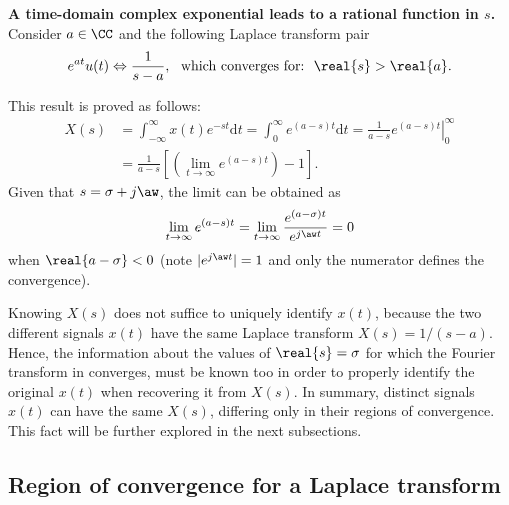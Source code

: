\bExample \textbf{A time-domain complex exponential leads to a rational function in $s$.}
Consider $a \in \CC$ and the following Laplace transform pair
\[
e^{at} u(t) \Leftrightarrow \frac{1}{{s - a}},\textrm{~~which converges for:~~} \real{s} > \real{a}.
\]
This result is proved as follows:
\begin{align*}
X(s) &= \int_{-\infty}^\infty x(t) e^{- s t} \textrm{d}t = \int_{0}^\infty e^{(a - s) t} \textrm{d}t =
\left. \frac 1 {a-s} {e^{(a-s) t}} \right|_{0}^{\infty}\\
& = \frac 1 {a-s} \left[ (\lim_{t \rightarrow \infty} e^{(a-s)t} )- 1 \right].
\end{align*}
Given that $s=\sigma+j\aw$, the limit can be obtained as
\[
\lim_{t \rightarrow \infty} e^{(a-s) t} = \lim_{t \rightarrow \infty} \frac{e^{(a-\sigma)t}} {e^{j\aw t}} = 0
\]
when $\real{a - \sigma} < 0$ (note $|e^{j\aw t} |=1$ and only the numerator defines the convergence).
\eExample

Knowing $X(s)$ does not suffice to uniquely identify $x(t)$, because the two different signals $x(t)$ have the same Laplace transform $X(s)=1/(s-a)$. Hence, the information about the values of $\real{s}=\sigma$ for which the Fourier transform in  converges, must be known too in order to properly identify the original $x(t)$ when recovering it from $X(s)$. In summary, distinct signals $x(t)$ can have the same $X(s)$, differing only in their regions of convergence. This fact will be further explored in the next subsections.

\subsection{Region of convergence for a Laplace transform}

